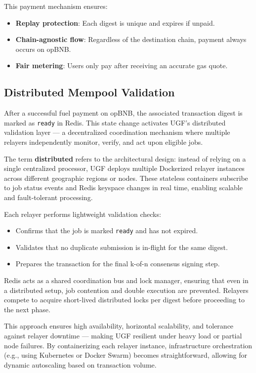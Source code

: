 \documentclass{article}
\begin{document}
This payment mechanism ensures:
\begin{itemize}
  \item \textbf{Replay protection}: Each digest is unique and expires if unpaid.
  \item \textbf{Chain-agnostic flow}: Regardless of the destination chain, payment always occurs on opBNB.
  \item \textbf{Fair metering}: Users only pay after receiving an accurate gas quote.
\end{itemize}

\subsection{Distributed Mempool Validation}

After a successful fuel payment on opBNB, the associated transaction digest is marked as \texttt{ready} in Redis. This state change activates UGF’s distributed validation layer — a decentralized coordination mechanism where multiple relayers independently monitor, verify, and act upon eligible jobs.

The term \textbf{distributed} refers to the architectural design: instead of relying on a single centralized processor, UGF deploys multiple Dockerized relayer instances across different geographic regions or nodes. These stateless containers subscribe to job status events and Redis keyspace changes in real time, enabling scalable and fault-tolerant processing.

Each relayer performs lightweight validation checks:
\begin{itemize}
  \item Confirms that the job is marked \texttt{ready} and has not expired.
  \item Validates that no duplicate submission is in-flight for the same digest.
  \item Prepares the transaction for the final k-of-n consensus signing step.
\end{itemize}

Redis acts as a shared coordination bus and lock manager, ensuring that even in a distributed setup, job contention and double execution are prevented. Relayers compete to acquire short-lived distributed locks per digest before proceeding to the next phase.

This approach ensures high availability, horizontal scalability, and tolerance against relayer downtime — making UGF resilient under heavy load or partial node failures. By containerizing each relayer instance, infrastructure orchestration (e.g., using Kubernetes or Docker Swarm) becomes straightforward, allowing for dynamic autoscaling based on transaction volume.
\end{document}
